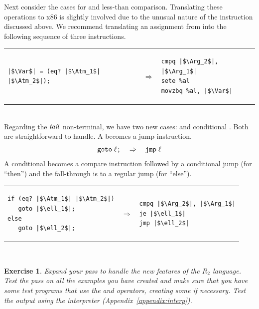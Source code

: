 \documentclass[11pt]{book}
\newtheorem{exercise}[theorem]{Exercise}
\begin{document}
Next consider the cases for  and less-than comparison.
Translating these operations to x86 is slightly involved due to the
unusual nature of the  instruction discussed above.  We
recommend translating an assignment from  into the following
sequence of three instructions. \\
\begin{tabular}{lll}
\begin{minipage}{0.4\textwidth}
\begin{lstlisting}
|$\Var$| = (eq? |$\Atm_1$| |$\Atm_2$|);
\end{lstlisting}
\end{minipage}
&
$\Rightarrow$
&
\begin{minipage}{0.4\textwidth}
\begin{lstlisting}
cmpq |$\Arg_2$|, |$\Arg_1$|
sete %al
movzbq %al, |$\Var$|
\end{lstlisting}
\end{minipage}
\end{tabular}  \\

Regarding the $\mathit{tail}$ non-terminal, we have two new cases: 
and conditional . Both are straightforward to handle. A
 becomes a jump instruction.
\[
\texttt{goto}\; \ell\texttt{;} \quad \Rightarrow \quad \texttt{jmp}\;\ell
\]
A conditional  becomes a compare instruction followed
by a conditional jump (for ``then'') and the fall-through is
to a regular jump (for ``else'').\\
\begin{tabular}{lll}
\begin{minipage}{0.4\textwidth}
\begin{lstlisting}
if (eq? |$\Atm_1$| |$\Atm_2$|)
   goto |$\ell_1$|;
else
   goto |$\ell_2$|;
\end{lstlisting}
\end{minipage}
&
$\Rightarrow$
&
\begin{minipage}{0.4\textwidth}
\begin{lstlisting}
cmpq |$\Arg_2$|, |$\Arg_1$|
je |$\ell_1$|
jmp |$\ell_2$|
\end{lstlisting}
\end{minipage}
\end{tabular}  \\

\begin{exercise}\normalfont
Expand your  pass to handle the new features
of the $R_2$ language. Test the pass on all the examples you have
created and make sure that you have some test programs that use the
 and \code{<} operators, creating some if necessary. Test
the output using the  interpreter
(Appendix~\ref{appendix:interp}).
\end{exercise}
\end{document}
